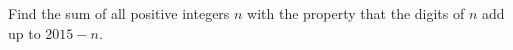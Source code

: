 Find the sum of all positive integers $n$ with the property that the digits of $n$ add up to $2015 - n$.
